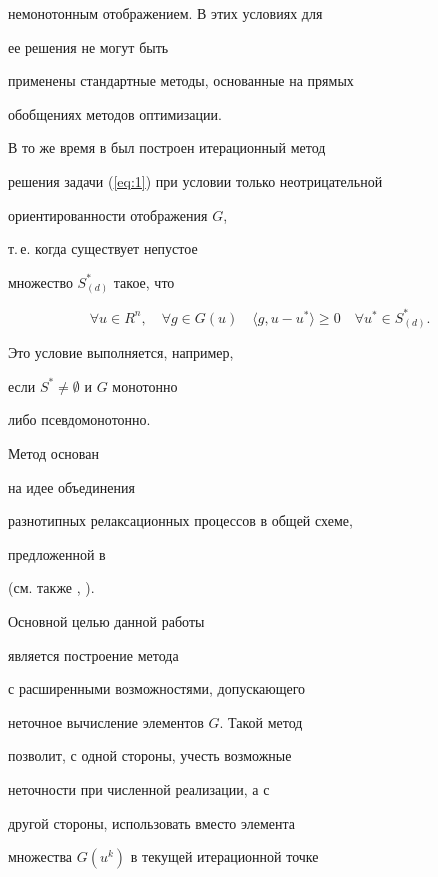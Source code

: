 немонотонным отображением. В этих условиях для


ее решения не могут быть


применены стандартные методы, основанные на прямых


обобщениях методов оптимизации.


В то же время в \cite{Kon96} был построен итерационный метод


решения задачи (\ref{eq:1}) при условии только неотрицательной


ориентированности отображения $G$,


т.\,е.{} когда существует непустое


множество $S^{*}_{(d)}$ такое, что


\begin{equation}


\label{eq:2}


\forall u \in R^{n}, \quad \forall g \in G(u) \quad


\langle g, u-u^{*} \rangle \geq 0 \quad \forall u^{*}\in


S^{*}_{(d)}.


\end{equation}


Это условие выполняется, например,


если $S^{*} \neq \emptyset$ и $G$ монотонно


либо псевдомонотонно.


Метод \cite{Kon96} основан


на идее объединения


разнотипных релаксационных процессов в общей схеме,


предложенной в \cite{Kon93b}


(см. также \cite{Kon93a}, \cite{Kon98}).





Основной целью данной работы


является построение метода


с расширенными возможностями, допускающего


неточное вычисление элементов $G$. Такой метод


позволит, с одной стороны, учесть возможные


неточности при численной реализации, а с


другой стороны, использовать вместо элемента


множества $G(u^{k})$ в текущей итерационной точке


